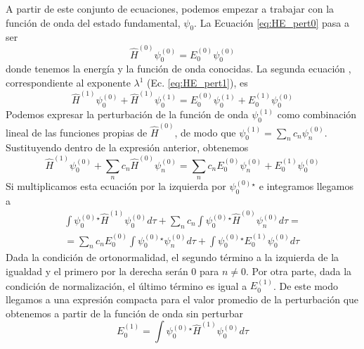 A partir de este conjunto de ecuaciones, podemos empezar a trabajar
con la función de onda del estado fundamental, $\psi_0$. La Ecuación
\ref{eq:HE_pert0} pasa a ser
\begin{equation}
    \hat{H}^{(0)}\psi_0^{(0)} = E_0^{(0)}\psi_0^{(0)}
\end{equation}
donde tenemos la energía y la función de onda conocidas. La segunda ecuación
, correspondiente al exponente $\lambda^1$ (Ec. \ref{eq:HE_pert1}), 
es 
\begin{equation}
    \hat{H}^{(1)}\psi_0^{(0)} + \hat{H}^{(1)}\psi_0^{(1)} = 
    E_0^{(0)}\psi_0^{(1)} + E_0^{(1)}\psi_0^{(0)}
\end{equation}
Podemos expresar la perturbación de la función de onda $\psi_0^{(1)}$ 
como combinación lineal de las funciones propias de $\hat{H}^{(0)}$,
de modo que $\psi_0^{(1)}=\sum_nc_n\psi_n^{(0)}$. Sustituyendo
dentro de la expresión anterior, obtenemos
\begin{equation}
    \hat{H}^{(1)}\psi_0^{(0)} + \sum_nc_n\hat{H}^{(0)}\psi_n^{(0)} = 
    \sum_nc_nE_0^{(0)}\psi_n^{(0)} + E_0^{(1)}\psi_0^{(0)}
\end{equation}
Si multiplicamos esta ecuación por la izquierda por $\psi_0^{(0)}^\star$
e integramos llegamos a
\begin{equation}
\begin{split}
  \int \psi_0^{(0)}^\star \hat{H}^{(1)}\psi_0^{(0)}d\tau +  \sum_nc_n\int \psi_0^{(0)}^\star\hat{H}^{(0)}\psi_n^{(0)}d\tau = \\
    = \sum_nc_nE_0^{(0)}\int \psi_0^{(0)}^\star\psi_n^{(0)}d\tau + \int \psi_0^{(0)}^\star E_0^{(1)}\psi_0^{(0)}d\tau
\end{split}
\end{equation}
Dada la condición de ortonormalidad, el segundo término a la izquierda de
la igualdad y el primero por la derecha serán $0$ para $n\neq 0$. Por otra
parte, dada la condición de normalización, el último término es igual a 
$E_0^{(1)}$. De este modo llegamos a una expresión compacta para el
valor promedio de la perturbación que obtenemos a partir de la función 
de onda sin perturbar
\begin{equation}
    E_0^{(1)}= \int \psi_0^{(0)}^\star \hat{H}^{(1)}\psi_0^{(0)}d\tau 
\end{equation}

